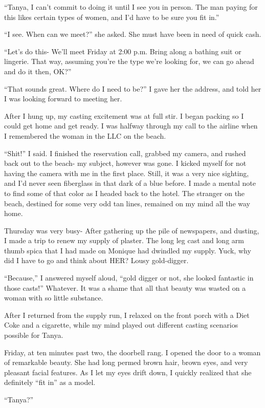 ``Tanya, I can't commit to doing it until I see you in person. The man paying for this likes
certain types of women, and I'd have to be sure you fit in.''

``I see. When can we meet?'' she asked. She must have been in need of quick cash.

``Let's do this- We'll meet Friday at 2:00 p.m. Bring along a bathing suit or lingerie. That
way, assuming you're the type we're looking for, we can go ahead and do it then, OK?''

``That sounds great. Where do I need to be?'' I gave her the address, and told her I was
looking forward to meeting her.

After I hung up, my casting excitement was at full stir. I began packing so I could get home
and get ready. I was halfway through my call to the airline when I remembered the woman in the
LLC on the beach.

``Shit!'' I said. I finished the reservation call, grabbed my camera, and rushed back out to
the beach- my subject, however was gone. I kicked myself for not having the camera with me in
the first place. Still, it was a very nice sighting, and I'd never seen fiberglass in that dark
of a blue before. I made a mental note to find some of that color as I headed back to the hotel.
The stranger on the beach, destined for some very odd tan lines, remained on my mind all the way
home.

Thursday was very busy- After gathering up the pile of newspapers, and dusting, I made a
trip to renew my supply of plaster. The long leg cast and long arm thumb spica that I had made
on Monique had dwindled my supply. Yuck, why did I have to go and think about HER? Lousy
gold-digger.

``Because,'' I answered myself aloud, ``gold digger or not, she looked fantastic in those
casts!'' Whatever. It was a shame that all that beauty was wasted on a woman with so little
substance.

After I returned from the supply run, I relaxed on the front porch with a Diet Coke and a
cigarette, while my mind played out different casting scenarios possible for Tanya.

Friday, at ten minutes past two, the doorbell rang. I opened the door to a woman of
remarkable beauty. She had long permed brown hair, brown eyes, and very pleasant facial
features. As I let my eyes drift down, I quickly realized that she definitely ``fit in'' as a
model.

``Tanya?''

